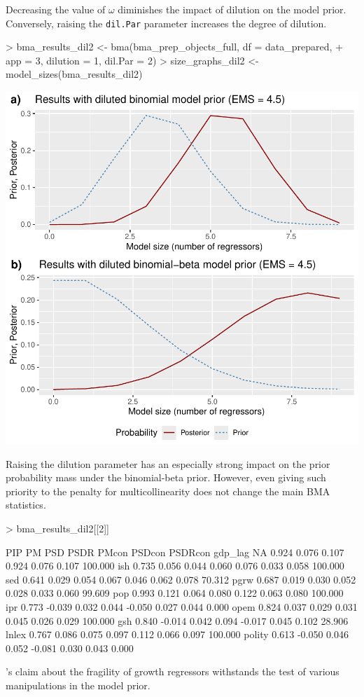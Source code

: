 \documentclass[a4paper]{article}
\begin{document}
Decreasing the value of $\omega$ diminishes the impact of dilution on the model prior. Conversely, raising the \verb+dil.Par+ parameter increases the degree of dilution.
\begin{Schunk}
\begin{Sinput}
> bma_results_dil2 <- bma(bma_prep_objects_full, df = data_prepared,
+                        app = 3, dilution = 1, dil.Par = 2)
> size_graphs_dil2 <- model_sizes(bma_results_dil2)
\end{Sinput}
\end{Schunk}
\includegraphics{bdsm_vignette-042}

Raising the dilution parameter has an especially strong impact on the prior probability mass under the binomial-beta prior. However, even giving such priority to the penalty for multicollinearity does not change the main BMA statistics.
\begin{Schunk}
\begin{Sinput}
> bma_results_dil2[[2]]
\end{Sinput}
\begin{Soutput}
          PIP     PM   PSD  PSDR  PMcon PSDcon PSDRcon    %
gdp_lag    NA  0.924 0.076 0.107  0.924  0.076   0.107 100.000
ish     0.735  0.056 0.044 0.060  0.076  0.033   0.058 100.000
sed     0.641  0.029 0.054 0.067  0.046  0.062   0.078  70.312
pgrw    0.687  0.019 0.030 0.052  0.028  0.033   0.060  99.609
pop     0.993  0.121 0.064 0.080  0.122  0.063   0.080 100.000
ipr     0.773 -0.039 0.032 0.044 -0.050  0.027   0.044   0.000
opem    0.824  0.037 0.029 0.031  0.045  0.026   0.029 100.000
gsh     0.840 -0.014 0.042 0.094 -0.017  0.045   0.102  28.906
lnlex   0.767  0.086 0.075 0.097  0.112  0.066   0.097 100.000
polity  0.613 -0.050 0.046 0.052 -0.081  0.030   0.043   0.000
\end{Soutput}
\end{Schunk}
\citet{Moral+2016}’s claim about the fragility of growth regressors withstands the test of various manipulations in the model prior.
\end{document}
